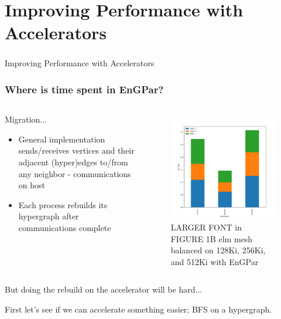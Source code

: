 \documentclass{beamer}
\begin{document}
\section{Improving Performance with Accelerators}
\begin{frame}
  \frametitle{}
  \center \huge{Improving Performance with Accelerators}
\end{frame}

\begin{frame}
  \frametitle{Where is time spent in EnGPar?}
  \begin{columns}
    \begin{column}{0.5\textwidth}
      Migration...
      \begin{itemize}
        \item General implementation sends/receives vertices and their adjacent
          (hyper)edges to/from any neighbor - communications on host
        \item Each process rebuilds its hypergraph after communications complete
      \end{itemize}
    \end{column}

    \begin{column}{0.5\textwidth}
      \begin{figure}
        \centering
        \includegraphics[width=.7\textwidth]{results/aero1Belm/migration.png}
        \caption{LARGER FONT in FIGURE 1B elm mesh balanced on 128Ki, 256Ki, and 512Ki with EnGPar}
      \end{figure}
    \end{column}
  \end{columns}

  But doing the rebuild on the accelerator will be hard...
  
  First let's see if we can accelerate something easier; BFS on a
  hypergraph.
\end{frame}
\end{document}
